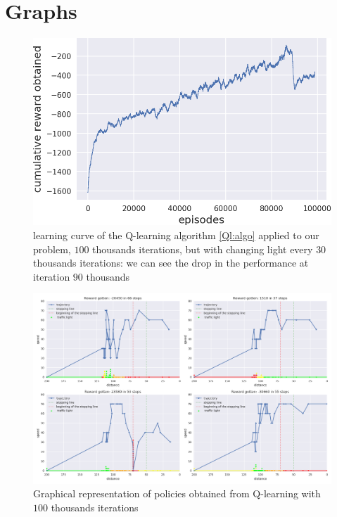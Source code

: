\documentclass[14pt,a4paper]{article}
\theoremstyle{definition}
\begin{document}
\section{Graphs} \label{GRAPHS}

\begin{figure}[h]
\centering
\captionsetup{justification=centering,margin=2cm}
\includegraphics[scale=0.6]{img/Q_learning_curve_random_light.png}
\caption{learning curve of the Q-learning algorithm \ref{Ql:algo} applied to our problem, $100$ thousands iterations, but with changing light every $30$ thousands iterations: we can see the drop in the performance at iteration $90$ thousands}
\label{curve_random}
\end{figure}


\begin{figure}[H]
\centering
\includegraphics[scale=0.4]{img/traj3.png}
\caption{Graphical representation of  policies obtained from Q-learning with $100$ thousands  iterations}
\label{failure}
\end{figure}
\vspace{1cm}
\end{document}
